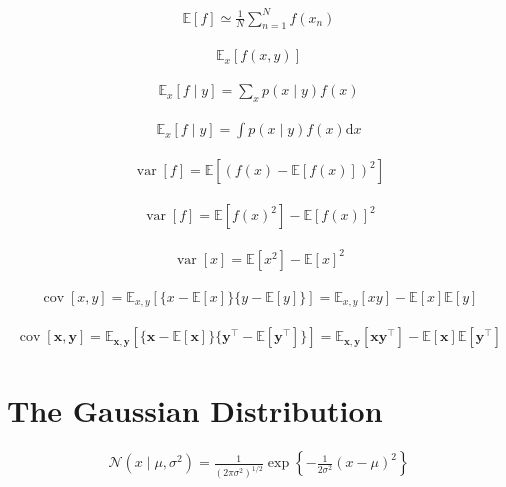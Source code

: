\documentclass{article}
\begin{document}
\begin{align*}
\mathbb{E}[f] \simeq \frac{1}{N} \sum_{n=1}^{N} f(x_n)
\tag{2.40}
\end{align*}

\begin{align*}
\mathbb{E}_{x}[f(x, y)]
\tag{2.41}
\end{align*}

\begin{align*}
\mathbb{E}_{x}[f \mid y] = \sum_{x} p(x \mid y) f(x)
\tag{2.42}
\end{align*}

\begin{align*}
\mathbb{E}_{x}[f \mid y] = \int p(x \mid y) f(x) \mathrm{d} x
\tag{2.43}
\end{align*}

\begin{align*}
\operatorname{var}[f] = \mathbb{E}\left[ (f(x) - \mathbb{E}[f(x)])^2 \right]
\tag{2.44}
\end{align*}

\begin{align*}
\operatorname{var}[f] = \mathbb{E}\left[ f(x)^2 \right] - \mathbb{E}[f(x)]^2
\tag{2.45}
\end{align*}

\begin{align*}
\operatorname{var}[x] = \mathbb{E}\left[ x^2 \right] - \mathbb{E}[x]^2
\tag{2.46}
\end{align*}

\begin{align*}
\operatorname{cov}[x, y] = \mathbb{E}_{x, y}\left[ \{x - \mathbb{E}[x]\} \{y - \mathbb{E}[y]\} \right] 
= \mathbb{E}_{x, y}[x y] - \mathbb{E}[x] \mathbb{E}[y]
\tag{2.47}
\end{align*}

\begin{align*}
\operatorname{cov}[\mathbf{x}, \mathbf{y}] = \mathbb{E}_{\mathbf{x}, \mathbf{y}}\left[ \{\mathbf{x} - \mathbb{E}[\mathbf{x}]\} \{\mathbf{y}^{\top} - \mathbb{E}[\mathbf{y}^{\top}]\} \right] 
= \mathbb{E}_{\mathbf{x}, \mathbf{y}}\left[ \mathbf{x} \mathbf{y}^{\top} \right] - \mathbb{E}[\mathbf{x}] \mathbb{E}[\mathbf{y}^{\top}]
\tag{2.48}
\end{align*}

\section{The Gaussian Distribution}

\begin{align*}
\mathcal{N}\left(x \mid \mu, \sigma^{2}\right)=\frac{1}{\left(2 \pi \sigma^{2}\right)^{1 / 2}} \exp \left\{-\frac{1}{2 \sigma^{2}}(x-\mu)^{2}\right\}
\tag{2.49}
\end{align*}
\end{document}
